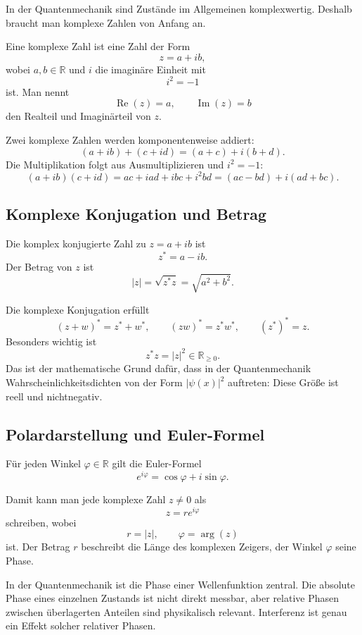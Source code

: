 In der Quantenmechanik sind Zustände im Allgemeinen komplexwertig. Deshalb braucht man komplexe Zahlen von Anfang an.

\begin{definitionbox}
Eine komplexe Zahl ist eine Zahl der Form
\[
    z = a + ib,
\]
wobei $a,b\in\mathbb{R}$ und $i$ die imaginäre Einheit mit
\[
    i^2=-1
\]
ist. Man nennt
\[
    \operatorname{Re}(z)=a,\qquad \operatorname{Im}(z)=b
\]
den Realteil und Imaginärteil von $z$.
\end{definitionbox}

Zwei komplexe Zahlen werden komponentenweise addiert:
\[
    (a+ib)+(c+id)=(a+c)+i(b+d).
\]
Die Multiplikation folgt aus Ausmultiplizieren und $i^2=-1$:
\[
    (a+ib)(c+id)=ac+iad+ibc+i^2bd=(ac-bd)+i(ad+bc).
\]

\subsection{Komplexe Konjugation und Betrag}

\begin{definitionbox}
Die komplex konjugierte Zahl zu $z=a+ib$ ist
\[
    z^* = a-ib.
\]
Der Betrag von $z$ ist
\[
    |z| = \sqrt{z^*z}=\sqrt{a^2+b^2}.
\]
\end{definitionbox}

Die komplexe Konjugation erfüllt
\[
    (z+w)^*=z^*+w^*,\qquad (zw)^*=z^*w^*,\qquad (z^*)^*=z.
\]
Besonders wichtig ist
\[
    z^*z = |z|^2\in\mathbb{R}_{\ge 0}.
\]
Das ist der mathematische Grund dafür, dass in der Quantenmechanik Wahrscheinlichkeitsdichten von der Form $|\psi(x)|^2$ auftreten: Diese Größe ist reell und nichtnegativ.

\subsection{Polardarstellung und Euler-Formel}

\begin{formulabox}
Für jeden Winkel $\varphi\in\mathbb{R}$ gilt die Euler-Formel
\[
    e^{i\varphi}=\cos\varphi+i\sin\varphi.
\]
\end{formulabox}

Damit kann man jede komplexe Zahl $z\ne 0$ als
\[
    z = r e^{i\varphi}
\]
schreiben, wobei
\[
    r=|z|,\qquad \varphi=\arg(z)
\]
ist. Der Betrag $r$ beschreibt die Länge des komplexen Zeigers, der Winkel $\varphi$ seine Phase.

\begin{conceptbox}
In der Quantenmechanik ist die Phase einer Wellenfunktion zentral. Die absolute Phase eines einzelnen Zustands ist nicht direkt messbar, aber relative Phasen zwischen überlagerten Anteilen sind physikalisch relevant. Interferenz ist genau ein Effekt solcher relativer Phasen.
\end{conceptbox}

